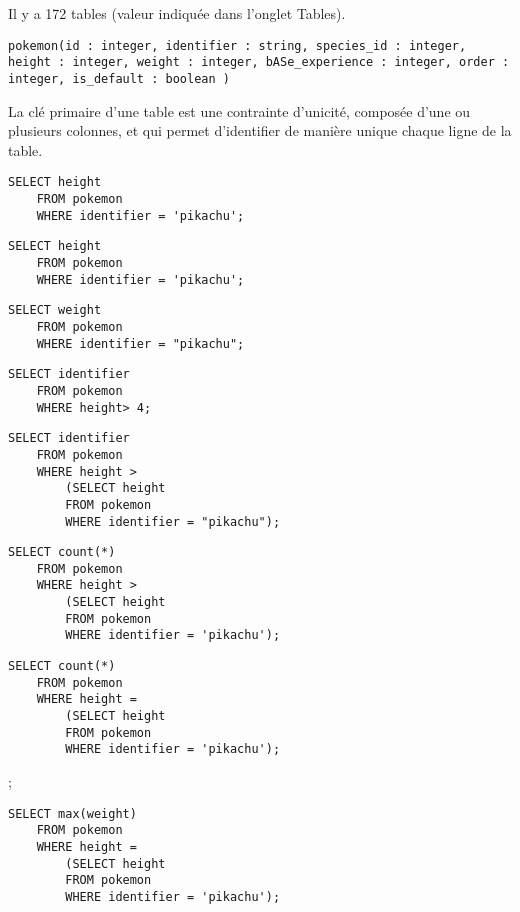 \question{}
Il y a 172 tables (valeur indiquée dans l'onglet Tables).


\question{}
\texttt{pokemon(id : integer, identifier : string, species\_id : integer, height : integer, weight : integer, bASe\_experience : integer, order : integer, is\_default : boolean )} 

\question{}
La clé primaire d'une table est une contrainte d'unicité, composée d'une ou plusieurs colonnes, et qui permet d'identifier de manière unique chaque ligne de la table.

%

\begin{lstlisting}
SELECT height 
	FROM pokemon 
	WHERE identifier = 'pikachu';
\end{lstlisting}
\question{}
\begin{lstlisting}
SELECT height 
	FROM pokemon 
	WHERE identifier = 'pikachu';
\end{lstlisting}


\question{}
\begin{lstlisting}
SELECT weight 
	FROM pokemon 
	WHERE identifier = "pikachu";
\end{lstlisting}


\question{}
\begin{lstlisting}
SELECT identifier 
	FROM pokemon
	WHERE height> 4;
\end{lstlisting}

\question{}
\begin{lstlisting}
SELECT identifier 
	FROM pokemon 
	WHERE height > 
		(SELECT height 
		FROM pokemon 
		WHERE identifier = "pikachu");
\end{lstlisting}

\question{}
\begin{lstlisting}
SELECT count(*) 
	FROM pokemon 
	WHERE height > 
		(SELECT height 
		FROM pokemon 
		WHERE identifier = 'pikachu');
\end{lstlisting}

\question{}
\begin{lstlisting}
SELECT count(*) 
	FROM pokemon 
	WHERE height = 
		(SELECT height 
		FROM pokemon 
		WHERE identifier = 'pikachu');
\end{lstlisting}
  ;

\begin{lstlisting}
SELECT max(weight) 
	FROM pokemon 
	WHERE height = 
		(SELECT height 
		FROM pokemon 
		WHERE identifier = 'pikachu'); 
\end{lstlisting}


